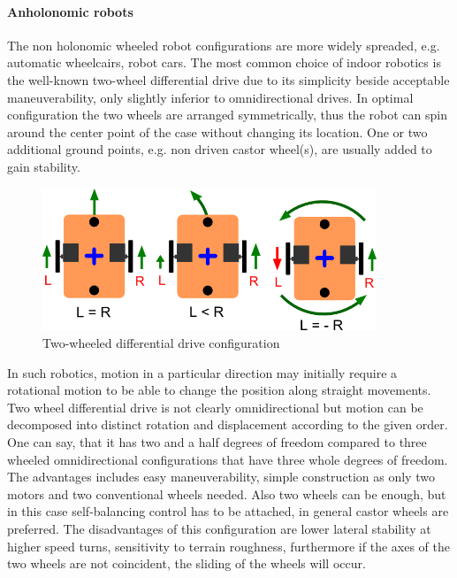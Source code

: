 \documentclass[12pt,english]{article}
\begin{document}
\paragraph{Anholonomic robots}
The non holonomic wheeled robot configurations are more widely spreaded, e.g. automatic wheelcairs, robot cars. The most common choice of indoor robotics is the well-known two-wheel differential drive due to its simplicity beside acceptable maneuverability, only slightly inferior to omnidirectional drives. In optimal configuration the two wheels are arranged symmetrically, thus the robot can spin around the center point of the case without changing its location. One or two additional ground points, e.g. non driven castor wheel(s), are usually added to gain stability. 
\begin{figure}[htb!]
	\centering
	\includegraphics[width=10cm]{figures/differential.png}
	\caption{Two-wheeled differential drive configuration}
	\label{differential}
\end{figure}
In such robotics, motion in a particular direction may initially require a rotational motion to be able to change the position along straight movements. Two wheel differential drive is not clearly omnidirectional but motion can be decomposed 
into distinct rotation and displacement according to the given order. One can say, that it has two and a half degrees of freedom compared to three wheeled omnidirectional configurations that have three whole degrees of freedom.
The advantages includes easy maneuverability, simple construction as only two motors and two conventional wheels needed. Also two wheels can be enough, but in this case self-balancing control has to be attached, in general castor wheels are preferred. The disadvantages of this configuration are lower lateral stability at higher speed turns, sensitivity to terrain roughness, furthermore if the axes of the two wheels are not coincident, the sliding of the wheels will occur.
\end{document}

